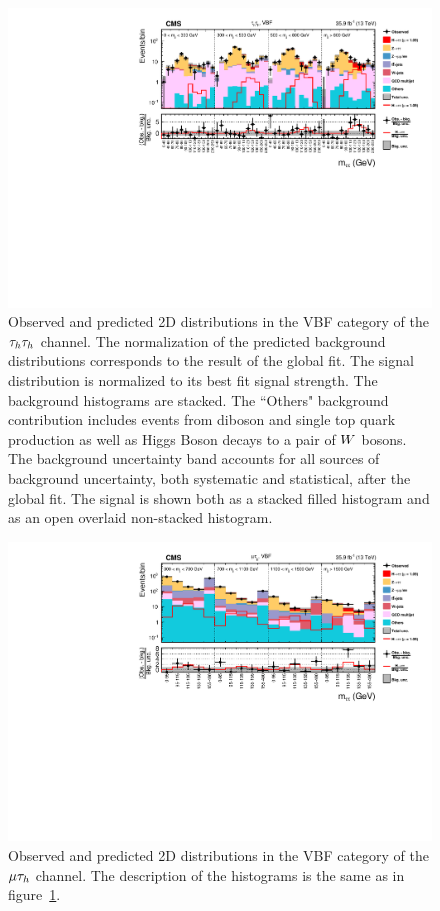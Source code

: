 \begin{figure}[htbp]
\centering
     \includegraphics[width=1.0\textwidth]{higgs_to_taus/plots/Figure_006.pdf}
     \caption{
Observed and predicted 2D distributions in the VBF category of the $\tau_{h}\tau_{h}$ channel.
The normalization of the predicted background distributions corresponds to the result of the global fit.
The signal distribution is normalized to its best fit signal strength. The background histograms are stacked. 
The ``Others" background contribution includes events from diboson and single top quark production as well 
as Higgs Boson decays to a pair of $W$ bosons. The background uncertainty band accounts for all sources 
of background uncertainty, both systematic and statistical, after the global fit. 
The signal is shown both as a stacked filled histogram and as an open overlaid non-stacked histogram.
}
     \label{fig:mass_tt_vbf}
\end{figure}

\begin{figure}[htbp]
\centering
     \includegraphics[width=1.0\textwidth]{higgs_to_taus/plots/Figure_007.pdf}
     \caption{Observed and predicted 2D distributions in the VBF category of the $\mu\tau_{h}$ channel. The description of the histograms is the same as in figure~\ref{fig:mass_tt_vbf}.}
     \label{fig:mass_mt_vbf}
\end{figure}

